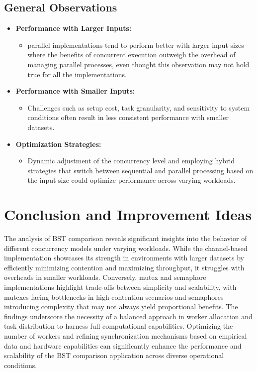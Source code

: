 \documentclass[letterpaper,12pt]{article}
\theoremstyle{remark}
\begin{document}
\subsection{General Observations}
\begin{itemize}
    \item \textbf{Performance with Larger Inputs:}
    \begin{itemize}
        \item parallel implementations tend to perform better with larger input sizes where the benefits of concurrent execution outweigh the overhead of managing parallel processes, even thought this observation may not hold true for all the implementations.
    \end{itemize}
    
    \item \textbf{Performance with Smaller Inputs:}
    \begin{itemize}
        \item Challenges such as setup cost, task granularity, and sensitivity to system conditions often result in less consistent performance with smaller datasets.
    \end{itemize}
    
    \item \textbf{Optimization Strategies:}
    \begin{itemize}
        \item Dynamic adjustment of the concurrency level and employing hybrid strategies that switch between sequential and parallel processing based on the input size could optimize performance across varying workloads.
    \end{itemize}
\end{itemize}


\section{Conclusion and Improvement Ideas}

The analysis of BST comparison reveals significant insights into the behavior of different concurrency models under varying workloads. While the channel-based implementation showcases its strength in environments with larger datasets by efficiently minimizing contention and maximizing throughput, it struggles with overheads in smaller workloads. Conversely, mutex and semaphore implementations highlight trade-offs between simplicity and scalability, with mutexes facing bottlenecks in high contention scenarios and semaphores introducing complexity that may not always yield proportional benefits. The findings underscore the necessity of a balanced approach in worker allocation and task distribution to harness full computational capabilities. Optimizing the number of workers and refining synchronization mechanisms based on empirical data and hardware capabilities can significantly enhance the performance and scalability of the BST comparison application across diverse operational conditions.
\end{document}
